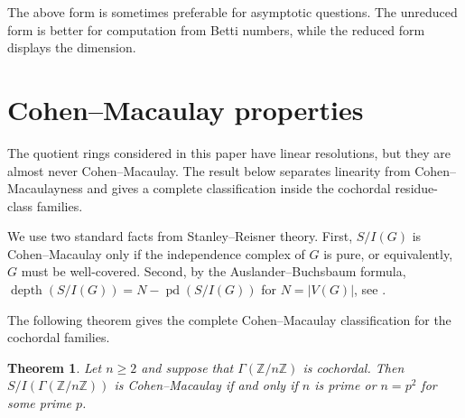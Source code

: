 \documentclass[12pt]{article}
\newtheorem{theorem}{Theorem}[section]
\theoremstyle{definition}
\begin{document}
\medskip
The above form is sometimes preferable for asymptotic questions.  The unreduced form is better for computation from Betti numbers, while the reduced form displays the dimension.

\medskip



\section{Cohen--Macaulay properties}\label{sec:cohen-macaulay}
 The quotient rings considered in this paper have linear resolutions, but they are almost never Cohen--Macaulay.  The result below separates linearity from Cohen--Macaulayness and gives a complete classification inside the cochordal residue-class families.

\medskip

We use two standard facts from Stanley--Reisner theory.  First, $S/I(G)$ is Cohen--Macaulay only if the independence complex of $G$ is pure, or equivalently, $G$ must be well-covered.  Second, by the Auslander--Buchsbaum formula, $\operatorname{depth}(S/I(G))=N-\operatorname{pd}(S/I(G))$ for $N=|V(G)|$, see \cite{BrunsHerzog1993,Villarreal2015}.

\medskip

\noindent The following theorem gives the complete Cohen--Macaulay classification for the cochordal families.
\begin{theorem}\label{thm:cm-classification}
Let $n\geq 2$ and suppose that $\Gamma(\mathbb{Z}/n\mathbb{Z})$ is cochordal.  Then $S/I(\Gamma(\mathbb{Z}/n\mathbb{Z}))$ is Cohen--Macaulay if and only if $n$ is prime or $n=p^2$ for some prime $p$.
\end{theorem}
\end{document}
